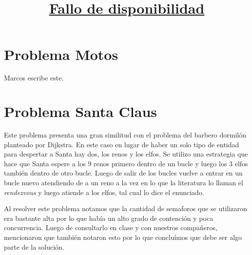\documentclass[11pt]{article} %
\begin{document}
\section{Problema Motos}
Marcos escribe este.

\section{Problema Santa Claus}
Este problema presenta una gran similitud con el problema del barbero dormilón planteado por Dijkstra. En este caso en lugar de haber un solo tipo de entidad para despertar a Santa hay dos, los renos y los elfos. Se utilizo una estrategia que hace que Santa espere a los 9 renos primero dentro de un bucle y luego los 3 elfos también dentro de otro bucle. Luego de salir de los bucles vuelve a entrar en un bucle nuevo atendiendo de a un reno a la vez en lo que la literatura lo llaman el \textit{rendezvous} y luego atiende a los elfos, tal cual lo dice el enunciado.

Al resolver este problema notamos que la cantidad de semaforos que se utilizaron era bastante alta por lo que había un alto grado de contención y poca concurrencia. Luego de consultarlo en clase y con nuestros compañeros, mencionaron que también notaron esto por lo que concluímos que debe ser algo parte de la solución.

\break
\title{\huge \underline{Fallo de disponibilidad}}
\end{document}
